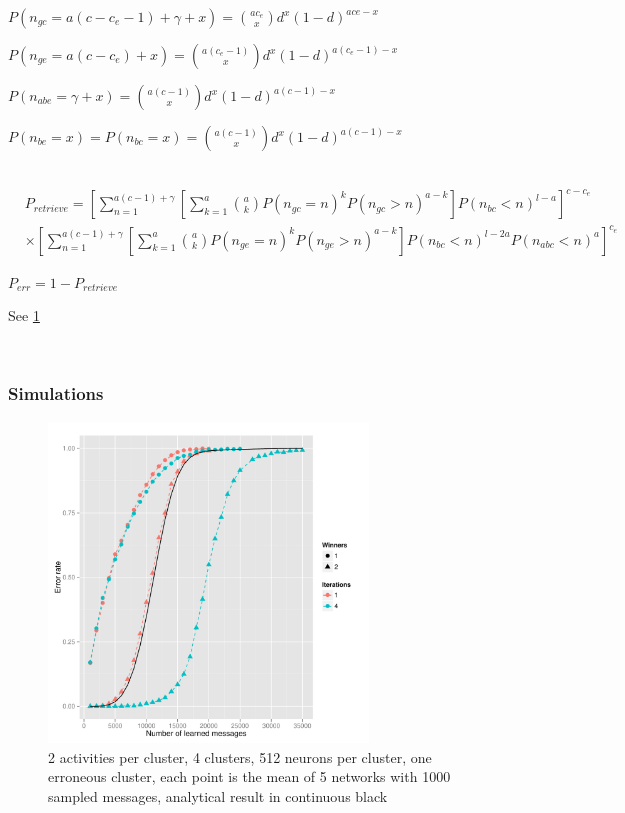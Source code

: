 \documentclass[english,11pt,twocolumn]{article}
\theoremstyle{definition}
\begin{document}
	$P(n_{gc} = a(c - c_e - 1) + \gamma + x) = {a c_e \choose x} d^x (1-d)^{a ce-x}$
	
	$P(n_{ge} = a(c - c_e) + x) = {a (c_e - 1) \choose x} d^x (1-d)^{a (c_e - 1)-x}$
	
	$P(n_{abe} = \gamma + x) = {a(c - 1) \choose x} d^x (1-d)^{a(c-1)-x}$
	
	$P(n_{be} = x) = P(n_{bc} = x) = {a(c - 1) \choose x} d^x (1-d)^{a(c- 1) -x}$	

	
	
	\newpage
	$\,$
	\newpage	
	\begin{align*}
	&P_{retrieve} = \left [ \sum_{n = 1}^{a(c-1) + \gamma} \left [ \sum_{k = 1}^{a} { a \choose k }   P(n_{gc} = n)^k P(n_{gc} > n)^{a-k} \right ] P(n_{bc} < n)^{l-a} \right ]^{c - c_e}\\ 
	 &\times \left [ \sum_{n = 1}^{a(c-1) +\gamma} \left[ \sum_{k = 1}^a { a \choose k } P(n_{ge} = n)^k P(n_{ge} > n)^{a-k} \right ] P(n_{bc} < n)^{l-2a} P(n_{abc} < n)^a \right ]^{c_e}
	\end{align*}
	
	$P_{err} = 1 - P_{retrieve}$	

	See \ref{corruptth}
	
	\newpage
	$\,$
	\newpage	
	
	\subsubsection{Simulations}
	\begin{figure}[!htb]
		\includegraphics[width=8.5cm]{Courbes/remplacement_figure3g1}
		\caption{2 activities per cluster, 4 clusters, 512 neurons per cluster, one erroneous cluster, each point is the mean of 5 networks with 1000 sampled messages, analytical result in continuous black}
		\label{corruptth}
	\end{figure}
		
\end{document}
